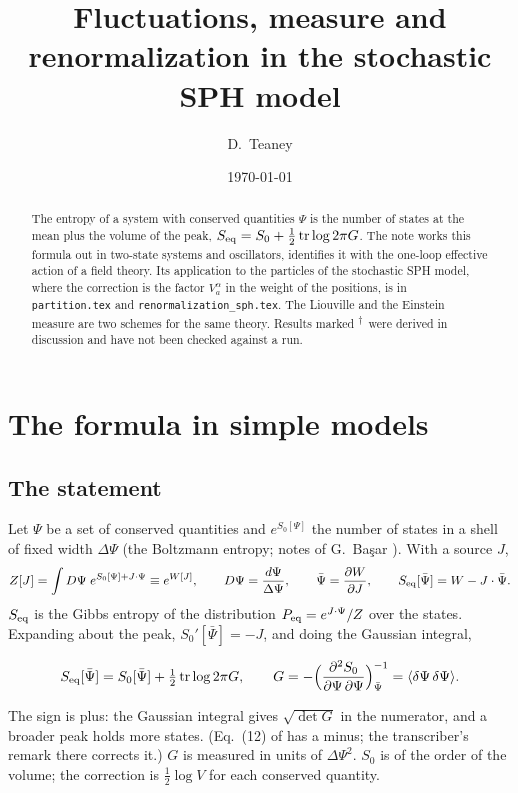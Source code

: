 \documentclass[11pt,aps,preprint,nofootinbib,superscriptaddress,tightenlines]{revtex4-2}
\newcommand{\avg}[1]{\langle #1\rangle}
\def\st{\begin{equation}}
\def\stp{\end{equation}}
\def\tr{\operatorname{tr}}
\newcommand{\unv}{\textsuperscript{$\dagger$}}
\begin{document}
\title{Fluctuations, measure and renormalization in the stochastic SPH model}
\author{D.~Teaney}
\date{\today}

\begin{abstract}
The entropy of a system with conserved quantities $\Psi$ is the number of states at the mean plus the volume of the peak,
$S_{\rm eq}=S_0+\tfrac12\tr\log2\pi G$.  The note works this formula out in two-state systems and oscillators, identifies it with the
one-loop effective action of a field theory.  Its application to the particles of the stochastic SPH model, where the correction is the
factor $V_a^{\alpha}$ in the weight of the positions, is in \texttt{partition.tex} and \nolinkurl{renormalization_sph.tex}.  The Liouville and the Einstein
measure are two schemes for the same theory.  Results marked \unv\ were derived in discussion and have not been checked against a run.
\end{abstract}

\maketitle
\tableofcontents

\section{The formula in simple models}
\label{sec:models}

\subsection{The statement}
\label{sec:statement}

Let $\Psi$ be a set of conserved quantities and $e^{S_0[\Psi]}$ the number of states in a shell of fixed width $\Delta\Psi$ (the Boltzmann
entropy; notes of G.~Ba\c{s}ar \cite{basar}).  With a source $J$,
\st
Z[J]=\int D\Psi\;e^{S_0[\Psi]+J\cdot\Psi}\equiv e^{W[J]},\qquad D\Psi=\frac{d\Psi}{\Delta\Psi},\qquad
\bar\Psi=\frac{\partial W}{\partial J},\qquad S_{\rm eq}[\bar\Psi]=W-J\cdot\bar\Psi .
\stp
$S_{\rm eq}$ is the Gibbs entropy of the distribution $P_{\rm eq}=e^{J\cdot\Psi}/Z$ over the states.  Expanding about the peak,
$S_0'[\bar\Psi]=-J$, and doing the Gaussian integral,
\begin{keyeq}
\st
S_{\rm eq}[\bar\Psi]=S_0[\bar\Psi]+\tfrac12\tr\log2\pi G,\qquad G=-\Big(\frac{\partial^2S_0}{\partial\Psi\,\partial\Psi}\Big)^{-1}_{\bar\Psi}=\avg{\delta\Psi\,\delta\Psi} .
\label{main}
\stp
\end{keyeq}
The sign is plus: the Gaussian integral gives $\sqrt{\det G}$ in the numerator, and a broader peak holds more states.  (Eq.~(12) of
\cite{basar} has a minus; the transcriber's remark there corrects it.)  $G$ is measured in units of $\Delta\Psi^2$.  $S_0$ is of the order of the
volume; the correction is $\tfrac12\log V$ for each conserved quantity.
\end{document}
